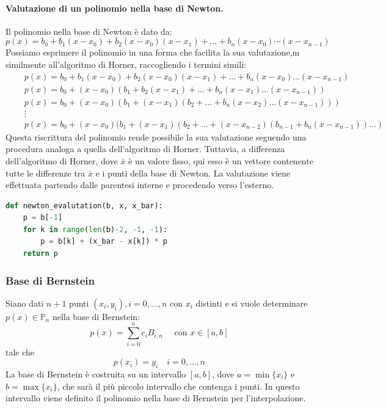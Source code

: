 \documentclass{article}
\begin{document}
\paragraph{Valutazione di un polinomio nella base di Newton.}
Il polinomio nella base di Newton è dato da:
$$p(x)=b_0+b_1(x-x_0)+b_2(x-x_0)(x-x_1)+\ldots+b_n(x-x_0)\cdots(x-x_{n-1})$$
Possiamo esprimere il polinomio in una forma che facilita la sua valutazione,m
similmente all'algoritmo di Horner, raccogliendo i termini simili:
\begin{align*}
& \quad p(x) = b_0 + b_1(x-x_0) + b_2(x-x_0)(x-x_1) + \ldots + b_n(x-x_0) \ldots (x-x_{n-1}) \\
& \quad p(x) = b_0 + (x-x_0)(b_1 + b_2(x-x_1) + \ldots + b_n(x-x_1) \ldots (x-x_{n-1})) \\
& \quad p(x) = b_0 + (x-x_0)(b_1 + (x-x_1)(b_2 + \ldots + b_n(x-x_2) \ldots (x-x_{n-1}))) \\
& \quad \vdots \\
& \quad p(x) = b_0 + (x-x_0)(b_1 + (x-x_1)(b_2 + \ldots + (x-x_{n-2})(b_{n-1} + b_n(x-x_{n-1}))\ldots)
\end{align*}
Questa riscrittura del polinomio rende possibile la sua valutazione seguendo
una procedura analoga a quella dell'algoritmo di Horner. Tuttavia, a
differenza dell'algoritmo di Horner, dove $\bar{x}$ è un valore fisso, qui
esso è un vettore contenente tutte le differenze tra $\bar{x}$ e i punti della
base di Newton. La valutazione viene effettuata partendo dalle parentesi
interne e procedendo verso l'esterno.
\begin{lstlisting}[language=Python]
def newton_evalutation(b, x, x_bar):
    p = b[-1]
    for k in range(len(b)-2, -1, -1):
        p = b[k] + (x_bar - x[k]) * p
    return p
\end{lstlisting}
\subsubsection{Base di Bernstein}
Siano dati $n+1$ punti $(x_i,y_i),i=0,\ldots,n$ con $x_i$ distinti e si vuole
determinare $p(x)\in \mathbb{P}_n$ nella base di Bernstein:
$$p(x)=\displaystyle\sum_{i=0}^{n}c_iB_{i,n}\quad \text{ con }x\in[a,b]$$
tale che 
$$p(x_i)=y_i\quad i=0,\ldots, n$$
La base di Bernstein è costruita su un intervallo $[a,b]$, dove
$a=\min\{x_i\}$ e $b=\max\{x_i\}$, che sarà il più piccolo intervallo che
contenga i punti. In questo intervallo viene definito il polinomio 
nella base di Bernstein per l'interpolazione. 
\end{document}
